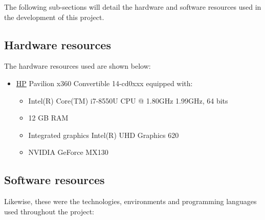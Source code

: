 The following sub-sections will detail the hardware and software resources used in the development of this project.

\subsection{Hardware resources}
\label{sec:hardwareRes}

The hardware resources used are shown below:

\begin{itemize}
\item \href{https://www8.hp.com/}{HP} Pavilion x360 Convertible 14-cd0xxx equipped with:
	\begin{itemize}
	\item Intel(R) Core(TM) i7-8550U CPU @ 1.80GHz 1.99GHz, 64 bits
	\item 12 GB RAM
	\item Integrated graphics Intel(R) UHD Graphics 620
	\item NVIDIA GeForce MX130
	\end{itemize}
\end{itemize}

\subsection{Software resources}
\label{sec:softwareRes}

Likewise, these were the technologies, environments and programming languages used throughout the project:

